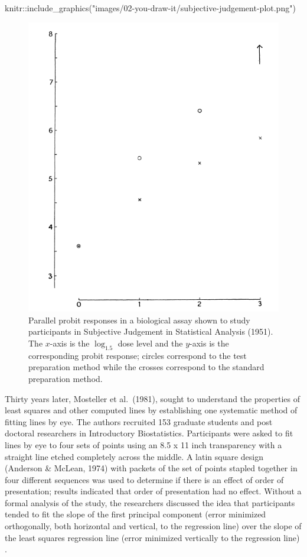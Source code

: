 \documentclass[print]{nuthesis}
\newenvironment{Shaded}{\begin{snugshade}}{\end{snugshade}}
\newcommand{\FunctionTok}[1]{\textcolor[rgb]{0.00,0.00,0.00}{#1}}
\newcommand{\NormalTok}[1]{#1}
\newcommand{\SpecialCharTok}[1]{\textcolor[rgb]{0.00,0.00,0.00}{#1}}
\newcommand{\StringTok}[1]{\textcolor[rgb]{0.31,0.60,0.02}{#1}}
\begin{document}
\begin{Shaded}
\begin{Highlighting}[]
\NormalTok{knitr}\SpecialCharTok{::}\FunctionTok{include\_graphics}\NormalTok{(}\StringTok{"images/02{-}you{-}draw{-}it/subjective{-}judgement{-}plot.png"}\NormalTok{)}
\end{Highlighting}
\end{Shaded}

\begin{figure}
\includegraphics[width=0.5\linewidth]{images/02-you-draw-it/subjective-judgement-plot} \caption[Subjective Judgement in Statistical Analysis (1951) Parallel Probits]{Parallel probit responses in a biological assay shown to study participants in Subjective Judgement in Statistical Analysis (1951). The $x$-axis is the $\log_{1.5}$ dose level and the $y$-axis is the corresponding probit response; circles correspond to the test preparation method while the crosses correspond to the standard preparation method.}\label{fig:subjective-judgement}
\end{figure}

Thirty years later, Mosteller et al.~(1981), sought to understand the properties of least squares and other computed lines by establishing one systematic method of fitting lines by eye.
The authors recruited 153 graduate students and post doctoral researchers in Introductory Biostatistics.
Participants were asked to fit lines by eye to four sets of points  using an 8.5 x 11 inch transparency with a straight line etched completely across the middle.
A latin square design (Anderson \& McLean, 1974) with packets of the set of points stapled together in four different sequences was used to determine if there is an effect of order of presentation; results indicated that order of presentation had no effect.
Without a formal analysis of the study, the researchers discussed the idea that participants tended to fit the slope of the first principal component (error minimized orthogonally, both horizontal and vertical, to the regression line) over the slope of the least squares regression line (error minimized vertically to the regression line) .
\end{document}
